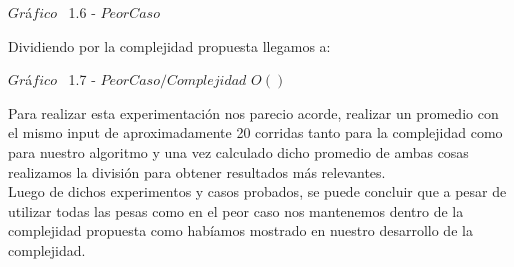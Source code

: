 \vspace*{0.3cm} \vspace*{0.3cm}
  \begin{center}
 {$Gr$\'a$fico$ \ 1.6 - $Peor Caso$}
  \end{center}
  \vspace*{0.3cm}

Dividiendo por la complejidad propuesta llegamos a:\\

\vspace*{0.3cm} \vspace*{0.3cm}
  \begin{center}
 {$Gr$\'a$fico$ \ 1.7 - $Peor Caso / Complejidad$ $O()$}
  \end{center}
  \vspace*{0.3cm}

Para realizar esta experimentaci\'on nos parecio acorde, realizar un promedio con el mismo input de aproximadamente 20 corridas
tanto para la complejidad como para nuestro algoritmo y una vez calculado dicho promedio de ambas cosas realizamos la divisi\'on para
obtener resultados m\'as relevantes.\\ 




Luego de dichos experimentos y casos probados, se puede concluir que a pesar de utilizar todas las pesas como en el peor caso nos mantenemos dentro de la complejidad propuesta como hab\'iamos mostrado en nuestro desarrollo de la complejidad.\\
